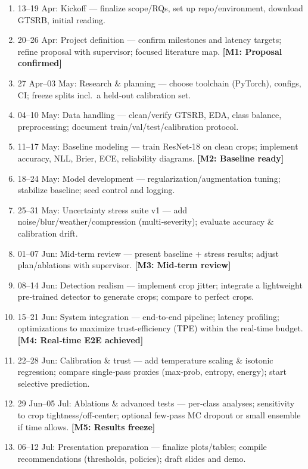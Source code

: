 \documentclass[11pt,a4paper]{article}
\begin{document}
\begin{enumerate}[label=\textbf{W\arabic*}, leftmargin=*]
  \item 13--19 Apr: Kickoff — finalize scope/RQs, set up repo/environment, download GTSRB, initial reading.
  \item 20--26 Apr: Project definition — confirm milestones and latency targets; refine proposal with supervisor; focused literature map. \textbf{[M1: Proposal confirmed]}
  \item 27 Apr--03 May: Research \& planning — choose toolchain (PyTorch), configs, CI; freeze splits incl.\ a held‑out calibration set.
  \item 04--10 May: Data handling — clean/verify GTSRB, EDA, class balance, preprocessing; document train/val/test/calibration protocol.
  \item 11--17 May: Baseline modeling — train ResNet‑18 on clean crops; implement accuracy, NLL, Brier, ECE, reliability diagrams. \textbf{[M2: Baseline ready]}
  \item 18--24 May: Model development — regularization/augmentation tuning; stabilize baseline; seed control and logging.
  \item 25--31 May: Uncertainty stress suite v1 — add noise/blur/weather/compression (multi‑severity); evaluate accuracy \& calibration drift.
  \item 01--07 Jun: Mid‑term review — present baseline + stress results; adjust plan/ablations with supervisor. \textbf{[M3: Mid‑term review]}
  \item 08--14 Jun: Detection realism — implement crop jitter; integrate a lightweight pre‑trained detector to generate crops; compare to perfect crops.
  \item 15--21 Jun: System integration — end‑to‑end pipeline; latency profiling; optimizations to maximize trust-efficiency (TPE) within the real-time budget. \textbf{[M4: Real‑time E2E achieved]}
  \item 22--28 Jun: Calibration \& trust — add temperature scaling \& isotonic regression; compare single‑pass proxies (max‑prob, entropy, energy); start selective prediction.
  \item 29 Jun--05 Jul: Ablations \& advanced tests — per‑class analyses; sensitivity to crop tightness/off‑center; optional few‑pass MC dropout or small ensemble if time allows. \textbf{[M5: Results freeze]}
  \item 06--12 Jul: Presentation preparation — finalize plots/tables; compile recommendations (thresholds, policies); draft slides and demo.

\end{enumerate}
\end{document}

